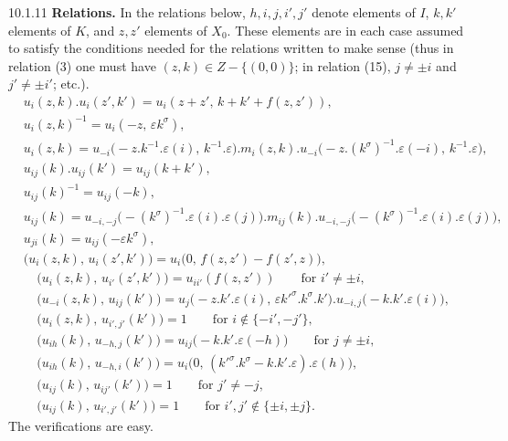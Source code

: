 \documentclass[12pt,a4paper,oneside,english]{smfart}
\makeatletter
\newcommand{\btanchor}[1]{\leavevmode\Hy@raisedlink{\hypertarget{bt:#1}{}}}
\theoremstyle{definition}
\theoremstyle{bt}
\makeatother
\begin{document}
\num{10.1.11}\btanchor{10.1.11} \textbf{Relations.}
In the relations below, $h,i,j,i',j'$ denote elements of $I$, $k,k'$ elements of
$K$, and $z,z'$ elements of $X_0$. These elements are in each case assumed to
satisfy the conditions needed for the relations written to make sense (thus in
relation (3) one must have $(z,k)\in Z-\{(0,0)\}$; in relation (15),
$j\neq\pm i$ and $j'\neq\pm i'$; etc.).
\begin{align}
&u_i(z,k).u_i(z',k')=u_i(z+z',\,k+k'+f(z,z')), \tag{1}\\
&u_i(z,k)^{-1}=u_i(-z,\,\varepsilon k^{\sigma}), \tag{2}\\
&u_i(z,k)=u_{-i}\bigl(-z.k^{-1}.\varepsilon(i),\,k^{-1}.\varepsilon\bigr)
   .m_i(z,k).
   u_{-i}\bigl(-z.(k^{\sigma})^{-1}.\varepsilon(-i),\,k^{-1}.\varepsilon\bigr), \tag{3}\\
&u_{ij}(k).u_{ij}(k')=u_{ij}(k+k'), \tag{4}\\
&u_{ij}(k)^{-1}=u_{ij}(-k), \tag{5}\\
&u_{ij}(k)=u_{-i,-j}\bigl(-(k^{\sigma})^{-1}.\varepsilon(i).\varepsilon(j)\bigr)
   .m_{ij}(k).
   u_{-i,-j}\bigl(-(k^{\sigma})^{-1}.\varepsilon(i).\varepsilon(j)\bigr), \tag{6}\\
&u_{ji}(k)=u_{ij}(-\varepsilon k^{\sigma}), \tag{7}\\
&\bigl(u_i(z,k),\,u_i(z',k')\bigr)=u_i\bigl(0,\,f(z,z')-f(z',z)\bigr), \tag{8}
\end{align}
\begin{align}
&\bigl(u_i(z,k),\,u_{i'}(z',k')\bigr)=u_{ii'}(f(z,z'))
   \qquad\text{for } i'\neq\pm i, \tag{9}\\
&\bigl(u_{-i}(z,k),\,u_{ij}(k')\bigr)
   =u_j\bigl(-z.k'.\varepsilon(i),\,\varepsilon k'^{\sigma}.k^{\sigma}.k'\bigr)
    .u_{-i,j}\bigl(-k.k'.\varepsilon(i)\bigr), \tag{10}\\
&\bigl(u_i(z,k),\,u_{i',j'}(k')\bigr)=1
   \qquad\text{for } i\notin\{-i',-j'\}, \tag{11}\\
&\bigl(u_{ih}(k),\,u_{-h,j}(k')\bigr)=u_{ij}\bigl(-k.k'.\varepsilon(-h)\bigr)
   \qquad\text{for } j\neq\pm i, \tag{12}\\
&\bigl(u_{ih}(k),\,u_{-h,i}(k')\bigr)
   =u_i\bigl(0,\,(k'^{\sigma}.k^{\sigma}-k.k'.\varepsilon).\varepsilon(h)\bigr), \tag{13}\\
&\bigl(u_{ij}(k),\,u_{ij'}(k')\bigr)=1 \qquad\text{for } j'\neq-j, \tag{14}\\
&\bigl(u_{ij}(k),\,u_{i',j'}(k')\bigr)=1
   \qquad\text{for } i',j'\notin\{\pm i,\pm j\}. \tag{15}
\end{align}
The verifications are easy.
\end{document}
